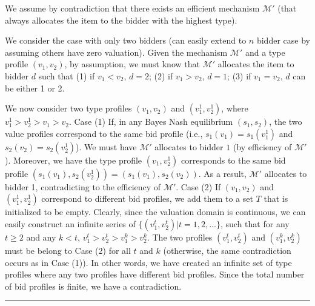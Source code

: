 \documentclass[letterpaper]{article}
\newenvironment{proof}{{Proof:}}{\hfill\rule{2mm}{2mm}}
\begin{document}
\begin{proof}
%	
%	

	We assume by contradiction that there exists an efficient mechanism $\mathcal{M'}$ (that always allocates the item to the bidder with the highest type). 
	
	We consider the case with only two bidders (can easily extend to $n$ bidder case by assuming others have zero valuation). Given the mechanism $\mathcal{M'}$ and a type profile $(v_1,v_2)$, by assumption, we must know that $\mathcal{M'}$ allocates the item to bidder $d$ such that (1) if $v_1<v_2$, $d=2$; (2) if $v_1>v_2$, $d=1$; (3) if $v_1=v_2$, $d$ can be either 1 or 2.
	
	We now consider two type profiles $(v_1,v_2)$ and $(v_1^1,v_2^1)$, where $v_1^1>v_2^1>v_1>v_2$. Case (1) If, in any Bayes Nash equilibrium $(s_1,s_2)$, the two value profiles correspond to the same bid profile (i.e., $s_1(v_1)=s_1(v_1^1)$ and $s_2(v_2)=s_2(v_2^1)$). We must have $\mathcal{M'}$ allocates to bidder $1$ (by efficiency of $\mathcal{M'}$). Moreover, we have the type profile $(v_1,v_2^1)$ corresponds to the same bid profile $(s_1(v_1),s_2(v_2^1))=(s_1(v_1),s_2(v_2))$. As a result, $\mathcal{M'}$ allocates to bidder 1, contradicting to the efficiency of $\mathcal{M'}$. Case (2) If $(v_1,v_2)$ and $(v_1^1,v_2^1)$ correspond to different bid profiles, we add them to a set $T$ that is initialized to be empty. Clearly, since the valuation domain is continuous, we can easily construct an infinite series of  $\{(v_1^t,v_2^t)|t=1,2,\ldots\}$, such that for any $t\geq 2$ and any $k<t$, $v_1^t>v_2^t>v_1^k>v_2^k$. The two profiles $(v_1^t,v_2^t)$ and $(v_1^k,v_2^k)$ must be belong to Case (2) for all $t$  and $k$ (otherwise, the same contradiction occurs as in Case (1)). In other words, we have created an infinite set of type profiles where any two profiles have different bid profiles. Since the total number of bid profiles is finite, we have a contradiction.

\end{proof}
\end{document}
